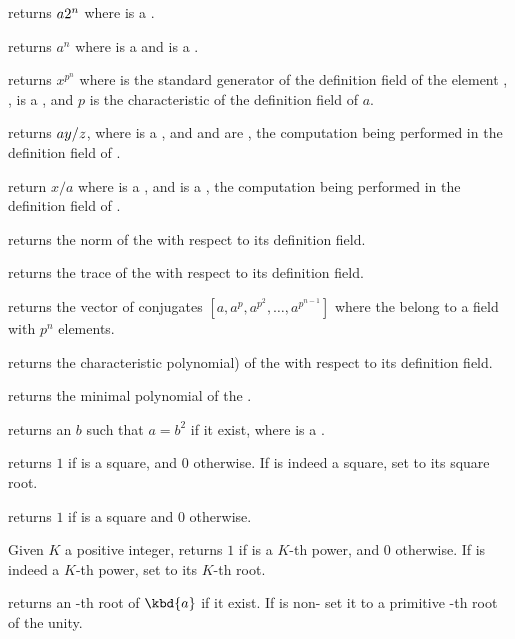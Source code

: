  returns $a\*2^n$ where  is a
.

 returns $a^n$ where  is a 
and  is a .

 returns $x^{p^n}$ where  is
the standard generator of the definition field of the  element
, ,  is a , and $p$ is the characteristic
of the definition field of $a$.

 returns $a\*y/z$, where 
is a , and  and  are , the computation being
performed in the definition field of .

 return $x/a$ where  is a
, and  is a , the computation being
performed in the definition field of .

 returns the norm of the   with
respect to its definition field.

 returns the trace of the   with
respect to its definition field.

 returns the vector of conjugates
$[a,a^p,a^{p^2},\ldots,a^{p^{n-1}}]$ where the   belong to a
field with $p^n$ elements.

 returns the characteristic polynomial) of the
  with respect to its definition field.

 returns the minimal polynomial of
the  .

 returns an  $b$ such that $a=b^2$ if
it exist, where  is a .

 returns $1$ if  is a
square, and $0$ otherwise. If  is indeed a square, set  to its
square root.

 returns $1$ if  is a square and $0$
otherwise.

 Given $K$ a positive integer,
returns $1$ if  is a $K$-th power, and $0$ otherwise. If  is
indeed a $K$-th power, set  to its $K$-th root.

 returns an -th root of
$\kbd{a}$ if it exist. If  is non- set it to a primitive
-th root of the unity.

